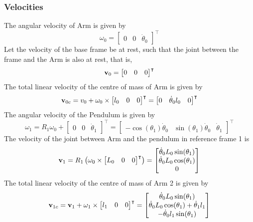 \subsubsection{Velocities}
The angular velocity of Arm is given by
\begin{equation}
	\omega_0 = 	\begin{bmatrix}
					0 & 0 & \dot{\theta}_0
				\end{bmatrix}^\intercal
\end{equation}
Let the velocity of the base frame be at rest, such that the joint
between the frame and the Arm is also at rest, that is,
\begin{equation}
	\text{\textbf{v}}_0 = 	\begin{bmatrix}
					0 & 0 & 0
			\end{bmatrix}^\intercal
\end{equation}
The total linear velocity of the centre of mass of Arm is
given by
\begin{equation}
	\text{\textbf{v}}_{0c} = v_0+\omega_0\times\begin{bmatrix}
					l_0 & 0 & 0
				\end{bmatrix}^\intercal = \begin{bmatrix}
				0 & \dot{\theta}_0l_0 & 0
				\end{bmatrix}^\intercal
\end{equation}
The angular velocity of the Pendulum is given by
\begin{equation}
\omega_1 = R_1\omega_0 + \begin{bmatrix}
				0 & 0 & \dot{\theta}_1
			\end{bmatrix}^\intercal = 
			\begin{bmatrix}
				-\cos(\theta_1)\dot{\theta}_0 & \sin(\theta_1)\dot{\theta}_0 & \dot{\theta}_1
			\end{bmatrix}^\intercal
\end{equation}
The velocity of the joint between Arm and the pendulum in
reference frame 1 is
\begin{equation}
	\text{\textbf{v}}_{1} = R_1\left( \omega_0\times	\begin{bmatrix}
									L_0 & 0 & 0
									\end{bmatrix}^\intercal \right) = 
	\begin{bmatrix}
		\dot{\theta}_0L_0\sin(\theta_1)\\
		\dot{\theta}_0L_0\cos(\theta_1)\\
		0
	\end{bmatrix}
\end{equation}
The total linear velocity of the centre of mass of Arm 2 is
given by
\begin{equation}
	\text{\textbf{v}}_{1c} = \text{\textbf{v}}_1+\omega_1\times\begin{bmatrix}
																	l_1 & 0& 0
															\end{bmatrix}^\intercal=
	\begin{bmatrix}
		\dot{\theta}_0L_0\sin(\theta_1)\\
		\dot{\theta}_0L_0\cos(\theta_1) + \dot{\theta}_1l_1\\
		-\dot{\theta}_0l_1\sin(\theta_1)
	\end{bmatrix}														
\end{equation}
